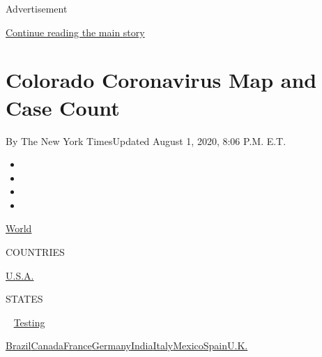 Advertisement

\protect\hyperlink{after-top}{Continue reading the main story}

\hypertarget{colorado-coronavirus-map-and-case-count}{%
\section{Colorado Coronavirus Map and Case
Count}\label{colorado-coronavirus-map-and-case-count}}

By The New York TimesUpdated August 1, 2020, 8:06 P.M. E.T.

\begin{itemize}
\item
\item
\item
\item
\end{itemize}

\href{https://www.nytimes.com/interactive/2020/world/coronavirus-maps.html}{World}~

COUNTRIES

\textbar{}
\href{https://www.nytimes.com/interactive/2020/us/coronavirus-us-cases.html}{U.S.A.}~

STATES

~
\href{https://www.nytimes.com/interactive/2020/us/coronavirus-testing.html}{Testing}

\href{https://www.nytimes.com/interactive/2020/world/americas/brazil-coronavirus-cases.html}{Brazil}\href{https://www.nytimes.com/interactive/2020/world/canada/canada-coronavirus-cases.html}{Canada}\href{https://www.nytimes.com/interactive/2020/world/europe/france-coronavirus-cases.html}{France}\href{https://www.nytimes.com/interactive/2020/world/europe/germany-coronavirus-cases.html}{Germany}\href{https://www.nytimes.com/interactive/2020/world/asia/india-coronavirus-cases.html}{India}\href{https://www.nytimes.com/interactive/2020/world/europe/italy-coronavirus-cases.html}{Italy}\href{https://www.nytimes.com/interactive/2020/world/americas/mexico-coronavirus-cases.html}{Mexico}\href{https://www.nytimes.com/interactive/2020/world/europe/spain-coronavirus-cases.html}{Spain}\href{https://www.nytimes.com/interactive/2020/world/europe/united-kingdom-coronavirus-cases.html}{U.K.}

